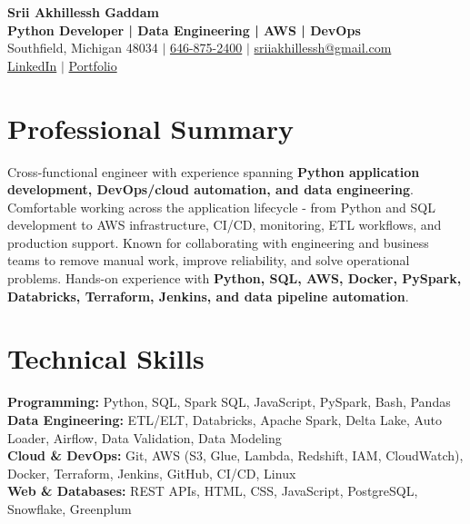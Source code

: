 \documentclass[letterpaper,10pt]{article}
\begin{document}
\fontsize{9.35pt}{10.45pt}\selectfont

\begin{center}
    {\LARGE \textbf{Srii Akhillessh Gaddam}} \\[-1pt]
    \textbf{Python Developer | Data Engineering | AWS | DevOps} \\[2pt]
    Southfield, Michigan 48034 $|$
    \href{tel:6468752400}{646-875-2400} $|$
    \href{mailto:sriiakhillessh@gmail.com}{sriiakhillessh@gmail.com} \\[1pt]
    \href{https://www.linkedin.com/in/srii-akhiilessh-gaddam-b48668191/}{LinkedIn} $|$
    \href{https://sriiakhillesshg.github.io/portfolio/}{Portfolio}
\end{center}
\vspace{-8pt}

\section{Professional Summary}
\small{Cross-functional engineer with experience spanning \textbf{Python application development, DevOps/cloud automation, and data engineering}. Comfortable working across the application lifecycle - from Python and SQL development to AWS infrastructure, CI/CD, monitoring, ETL workflows, and production support. Known for collaborating with engineering and business teams to remove manual work, improve reliability, and solve operational problems. Hands-on experience with \textbf{Python, SQL, AWS, Docker, PySpark, Databricks, Terraform, Jenkins, and data pipeline automation}.}

\section{Technical Skills}
\small{
\textbf{Programming:} Python, SQL, Spark SQL, JavaScript, PySpark, Bash, Pandas \\
\textbf{Data Engineering:} ETL/ELT, Databricks, Apache Spark, Delta Lake, Auto Loader, Airflow, Data Validation, Data Modeling \\
\textbf{Cloud \& DevOps:} Git, AWS (S3, Glue, Lambda, Redshift, IAM, CloudWatch), Docker, Terraform, Jenkins, GitHub, CI/CD, Linux \\
\textbf{Web \& Databases:} REST APIs, HTML, CSS, JavaScript, PostgreSQL, Snowflake, Greenplum
}
\end{document}
